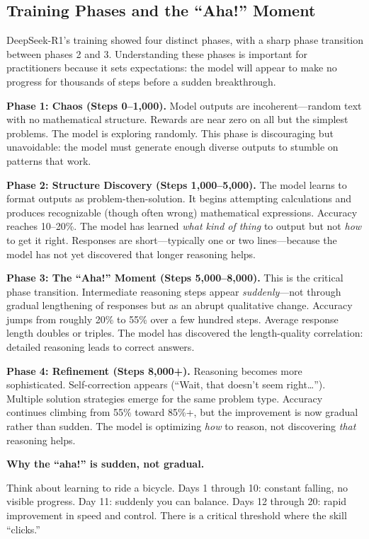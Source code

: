 \begin{chapterenv}
\section{Training Phases and the ``Aha!'' Moment}

DeepSeek-R1's training showed four distinct phases, with a sharp phase transition between phases 2 and 3. Understanding these phases is important for practitioners because it sets expectations: the model will appear to make no progress for thousands of steps before a sudden breakthrough.

\textbf{Phase 1: Chaos (Steps 0--1,000).} Model outputs are incoherent---random text with no mathematical structure. Rewards are near zero on all but the simplest problems. The model is exploring randomly. This phase is discouraging but unavoidable: the model must generate enough diverse outputs to stumble on patterns that work.

\textbf{Phase 2: Structure Discovery (Steps 1,000--5,000).} The model learns to format outputs as problem-then-solution. It begins attempting calculations and produces recognizable (though often wrong) mathematical expressions. Accuracy reaches 10--20\%. The model has learned \textit{what kind of thing} to output but not \textit{how} to get it right. Responses are short---typically one or two lines---because the model has not yet discovered that longer reasoning helps.

\textbf{Phase 3: The ``Aha!'' Moment (Steps 5,000--8,000).} This is the critical phase transition. Intermediate reasoning steps appear \textit{suddenly}---not through gradual lengthening of responses but as an abrupt qualitative change. Accuracy jumps from roughly 20\% to 55\% over a few hundred steps. Average response length doubles or triples. The model has discovered the length-quality correlation: detailed reasoning leads to correct answers.

\textbf{Phase 4: Refinement (Steps 8,000+).} Reasoning becomes more sophisticated. Self-correction appears (``Wait, that doesn't seem right\ldots''). Multiple solution strategies emerge for the same problem type. Accuracy continues climbing from 55\% toward 85\%+, but the improvement is now gradual rather than sudden. The model is optimizing \textit{how} to reason, not discovering \textit{that} reasoning helps.

\begin{infobox}
\textbf{Why the ``aha!'' is sudden, not gradual.}

Think about learning to ride a bicycle. Days 1 through 10: constant falling, no visible progress. Day 11: suddenly you can balance. Days 12 through 20: rapid improvement in speed and control. There is a critical threshold where the skill ``clicks.''


\end{infobox}
\end{chapterenv}
